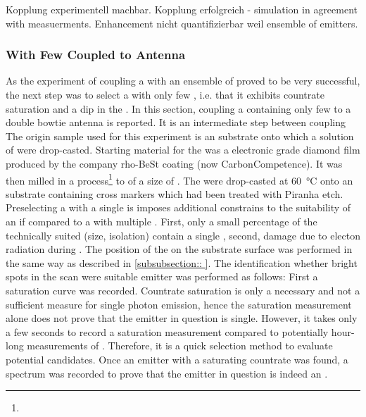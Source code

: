			Kopplung experimentell machbar.
			Kopplung erfolgreich - simulation in agreement with measuerments.
			Enhancement nicht quantifizierbar weil ensemble of emitters.



		\subsubsection{\Nd With Few \siv Coupled to Antenna}\label{subsubsection::antenna_single_siv}

			As the experiment of coupling a \nd with an ensemble of \sivs proved to be very successful, the next step was to select a \nd with only few \sivs, i.e. that it exhibits countrate saturation and a dip in the \gtf.
			In this section, coupling a \nd containing only few \sivs to a double bowtie antenna is reported.
			It is an intermediate step between coupling
			The origin sample used for this experiment is an \ir substrate onto which a solution of \nds were drop-casted.
			Starting material for the \nds was a electronic grade diamond film produced by the company rho-BeSt coating (now CarbonCompetence).
			It was then milled in a \basd process\footnote{\krueger} to \nds of a size of .
			The \nds were drop-casted at \SI{60}{\celsius} onto an \ir substrate containing cross markers which had been treated with Piranha etch.
			\\
			Preselecting a \nd with a single \siv is imposes additional constrains to the suitability of an \nd if compared to a \nd with multiple \sivs.
			First, only a small percentage of the technically suited \nds (size, isolation) contain a single \siv, second, damage due to electon radiation during \pp.
			The position of the \sivs on the substrate surface was performed in the same way as described in \autoref{subsubsection::
			}.
			The identification whether bright spots in the scan were suitable emitter was performed as follows:
			First a saturation curve was recorded.
			Countrate saturation is only a necessary and not a sufficient measure for single photon emission, hence the saturation measurement alone does not prove that the emitter in question is single.
			However, it takes only a few seconds to record a saturation measurement compared to potentially hour-long measurements of \gtfs.
			Therefore, it is a quick selection method to evaluate potential candidates.
			Once an emitter with a saturating countrate was found, a spectrum was recorded to prove that the emitter in question is indeed an \siv.
